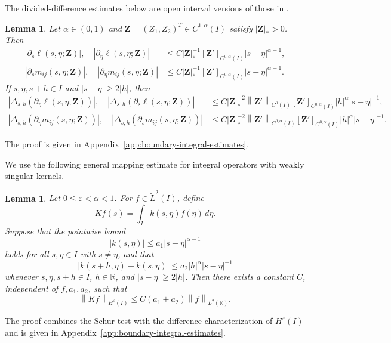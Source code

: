 \documentclass[11pt,reqno]{amsart}
\theoremstyle{plain}
\newtheorem{lemma}[theorem]{Lemma}
\theoremstyle{definition}
\numberwithin{equation}{section}
\newcommand{\paren}[1]{\left(#1\right)}
\newcommand{\p}{\partial}
\newcommand{\wt}[1]{\widetilde{#1}}
\newcommand{\bm}[1]{\boldsymbol{#1}}
\newcommand{\abs}[1]{\left\lvert #1 \right\rvert}
\newcommand{\norm}[1]{\left\lVert #1 \right\rVert}
\newcommand{\R}{\mathbb{R}}
\newcommand{\ci}[1]{C^{#1}(I)}
\newcommand{\hi}[1]{H^{#1}(I)}
\begin{document}
The divided-difference estimates below are open interval versions of those in
\cite[Section~2]{MoriRodenbergSpirn2019Peskin}.
\begin{lemma}\label{LM-kernel-est}
Let $\alpha\in(0,1)$ and
$\bm Z=(Z_1,Z_2)^T\in\ci{1,\alpha}$ satisfy $\abs{\bm Z}_*>0$.
Then
\begin{align}
    \abs{\p_s\ell(s,\eta;\bm Z)},\quad
    \abs{\p_\eta \ell(s,\eta;\bm Z)}
    &\le C\abs{\bm Z}_*^{-1}[\bm Z']_{\ci{0,\alpha}}
    \abs{s-\eta}^{\alpha-1},\label{eqn:LM-1}\\
    \abs{\p_sm_{ij}(s,\eta;\bm Z)},\quad
    \abs{\p_\eta m_{ij}(s,\eta;\bm Z)}
    &\le C\abs{\bm Z}_*^{-1}[\bm Z']_{\ci{0,\alpha}}
    \abs{s-\eta}^{\alpha-1}.
    \label{eqn:LM-2}
\end{align}
If $s,\eta,s+h\in I$ and $\abs{s-\eta}\ge2\abs h$, then
\begin{align}
    \abs{\Delta_{s,h}\paren{\p_\eta \ell(s,\eta;\bm Z)}},\quad
    \abs{\Delta_{s,h}\paren{\p_s\ell(s,\eta;\bm Z)}}
    &\le C\abs{\bm Z}_*^{-2}\norm{\bm Z'}_{\ci{0}}[\bm Z']_{\ci{0,\alpha}}\abs h^\alpha\abs{s-\eta}^{-1},
    \label{eqn:LM-3}\\
    \abs{\Delta_{s,h}\paren{\p_\eta m_{ij}(s,\eta;\bm Z)}},\quad
    \abs{\Delta_{s,h}\paren{\p_sm_{ij}(s,\eta;\bm Z)}}
    &\le C\abs{\bm Z}_*^{-2}\norm{\bm Z'}_{\ci{0,\alpha}}[\bm Z']_{\ci{0,\alpha}}\abs h^\alpha\abs{s-\eta}^{-1}.
    \label{eqn:LM-4}
\end{align}
\end{lemma}

The proof is given in Appendix~\ref{app:boundary-integral-estimates}.


We use the following general mapping estimate for integral operators with weakly singular kernels.
\begin{lemma}\label{K-op}
Let $0\le\varepsilon<\alpha<1$.
For $f\in\wt L^2(I)$, define
\begin{equation}
    K f  (s) = \int_I k(s,\eta) f(\eta)\,d\eta.
\end{equation}
Suppose that the pointwise bound
\begin{equation}\label{eqn:kernel-pointwise-hypothesis}
    \abs{k(s,\eta)} \le a_1 \abs{s-\eta}^{\alpha-1}
\end{equation}
holds for all $s,\eta\in I$ with $s\ne\eta$, and that
\begin{equation}\label{eqn:kernel-increment-hypothesis}
    \abs{k(s+h,\eta)-k(s,\eta)}
    \le a_2\abs{h}^\alpha\abs{s-\eta}^{-1}
\end{equation}
whenever $s,\eta,s+h\in I$, $h\in\R$, and
$\abs{s-\eta}\ge2\abs h$.
Then there exists a constant $C$, independent of $f,a_1,a_2$, such that
\begin{equation}\label{eqn:kernel-mapping-bound}
    \norm{K f}_{\hi{\varepsilon}} \le C \paren{a_1+a_2}\norm{f}_{L^2(\R)}.
\end{equation}
\end{lemma}
The proof combines the Schur test with the difference characterization of
$H^\varepsilon(I)$ and is given in Appendix~\ref{app:boundary-integral-estimates}.
\end{document}
